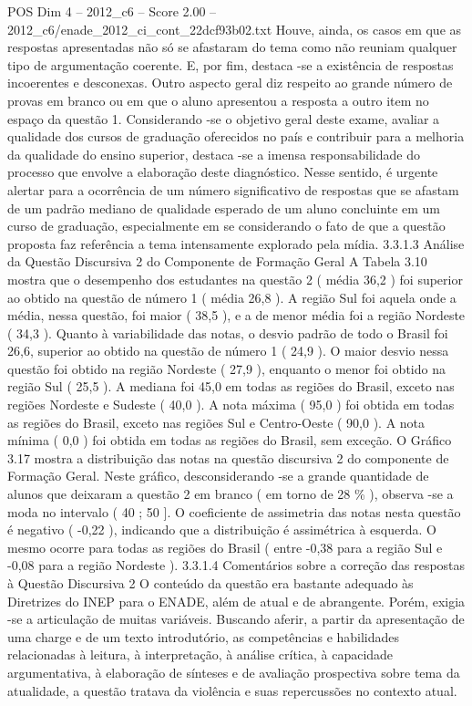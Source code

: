\begin{textsample}{POS Dim 4 – 2012\_c6 – Score 2.00 – 2012\_c6/enade\_2012\_ci\_cont\_22dcf93b02.txt}
Houve, ainda, os casos em que as respostas apresentadas não só se afastaram do tema como não reuniam qualquer tipo de argumentação coerente.
E, por fim, destaca -se a existência de respostas incoerentes e desconexas.
Outro aspecto geral diz respeito ao grande número de provas em branco ou em que o aluno apresentou a resposta a outro item no espaço da questão 1.
Considerando -se o objetivo geral deste exame, avaliar a qualidade dos cursos de graduação oferecidos no país e contribuir para a melhoria da qualidade do ensino superior, destaca -se a imensa responsabilidade do processo que envolve a elaboração deste diagnóstico.
Nesse sentido, é urgente alertar para a ocorrência de um número significativo de respostas que se afastam de um padrão mediano de qualidade esperado de um aluno concluinte em um curso de graduação, especialmente em se considerando o fato de que a questão proposta faz referência a tema intensamente explorado pela mídia. 3.3.1.3 Análise da Questão Discursiva 2 do Componente de Formação Geral A Tabela 3.10 mostra que o desempenho dos estudantes na questão 2 ( média 36,2 ) foi superior ao obtido na questão de número 1 ( média 26,8 ).
A região Sul foi aquela onde a média, nessa questão, foi maior ( 38,5 ), e a de menor média foi a região Nordeste ( 34,3 ).
Quanto à variabilidade das notas, o desvio padrão de todo o Brasil foi 26,6, superior ao obtido na questão de número 1 ( 24,9 ).
O maior desvio nessa questão foi obtido na região Nordeste ( 27,9 ), enquanto o menor foi obtido na região Sul ( 25,5 ).
A mediana foi 45,0 em todas as regiões do Brasil, exceto nas regiões Nordeste e Sudeste ( 40,0 ).
A nota máxima ( 95,0 ) foi obtida em todas as regiões do Brasil, exceto nas regiões Sul e Centro-Oeste ( 90,0 ).
A nota mínima ( 0,0 ) foi obtida em todas as regiões do Brasil, sem exceção.
O Gráfico 3.17 mostra a distribuição das notas na questão discursiva 2 do componente de Formação Geral.
Neste gráfico, desconsiderando -se a grande quantidade de alunos que deixaram a questão 2 em branco ( em torno de 28 \% ), observa -se a moda no intervalo ( 40 ; 50 ].
O coeficiente de assimetria das notas nesta questão é negativo ( -0,22 ), indicando que a distribuição é assimétrica à esquerda.
O mesmo ocorre para todas as regiões do Brasil ( entre -0,38 para a região Sul e -0,08 para a região Nordeste ). 3.3.1.4 Comentários sobre a correção das respostas à Questão Discursiva 2 O conteúdo da questão era bastante adequado às Diretrizes do INEP para o ENADE, além de atual e de abrangente.
Porém, exigia -se a articulação de muitas variáveis.
Buscando aferir, a partir da apresentação de uma charge e de um texto introdutório, as competências e habilidades relacionadas à leitura, à interpretação, à análise crítica, à capacidade argumentativa, à elaboração de sínteses e de avaliação prospectiva sobre tema da atualidade, a questão tratava da violência e suas repercussões no contexto atual.

\end{textsample}

